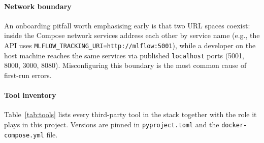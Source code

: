 \documentclass[conference,a4paper,10pt]{IEEEtran}
\begin{document}
\paragraph{Network boundary} An onboarding pitfall worth emphasising
early is that two URL spaces coexist: inside the Compose network
services address each other by service name (e.g., the API uses
\texttt{MLFLOW\_TRACKING\_URI=http://mlflow:5001}), while a developer
on the host machine reaches the same services via published
\texttt{localhost} ports (5001, 8000, 3000, 8080). Misconfiguring this
boundary is the most common cause of first-run errors.

\paragraph{Tool inventory} Table~\ref{tab:tools} lists every
third-party tool in the stack together with the role it plays in this
project. Versions are pinned in \texttt{pyproject.toml} and the
\texttt{docker-compose.yml} file.
\end{document}
